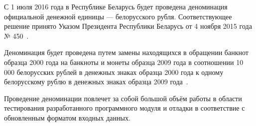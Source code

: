 С 1 июля 2016 года в Республике Беларусь будет проведена деноминация официальной
денежной единицы --- белорусского рубля. Соответствующее решение принято Указом
Президента Республики Беларусь от 4 ноября 2015 года № 450~\cite{denomination_decree}.

Деноминация будет проведена путем замены находящихся в обращении банкнот
образца 2000 года на банкноты и монеты образца 2009 года в соотношении 10 000 белорусских
рублей в денежных знаках образца 2000 года к одному белорусскому рублю в денежных
знаках образца 2009 года~\cite{denomination_news}.

Проведение деноминации повлечет за собой большой объём работы в области
тестирования разработанного программного модуля и отладки в соответствие с
обновленным форматом входных данных.
